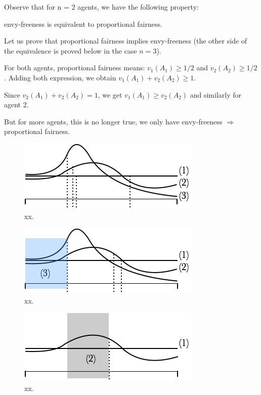 \bigskip

Observe that for n = 2 agents, we have the following property:

\begin{prop}
envy-freeness is equivalent to proportional fairness.
\end{prop}

Let us prove that proportional fairness implies envy-freeness (the other side of the equivalence is proved below in the case $n=3$).

For both agents, proportional fairness means: $v_1(A_1) \geq 1/2$ and $v_2(A_2) \geq 1/2$.
Adding both expression, we obtain $v_1(A_1)+v_2(A_2) \geq 1$.

Since $v_2(A_1) + v_2(A_2) = 1$, we get 
$v_1(A_1) \geq v_2(A_2)$ and similarly for agent 2. 
\bigskip

But for more agents, this is no longer true, we only have envy-freeness $\Rightarrow$ proportional fairness.
\begin{figure}[htb]
\begin{center}
        \includegraphics[scale=0.6]{FiguresMaths/CakeEnvyFree1}
        \caption{xx.}
        \label{Fig:cakeEnvyFree1}
\end{center}
\end{figure}
\begin{figure}[htb]
\begin{center}
        \includegraphics[scale=0.6]{FiguresMaths/CakeEnvyFree2}
        \caption{xx.}
        \label{Fig:cakeEnvyFree2}
\end{center}
\end{figure}
\begin{figure}[htb]
\begin{center}
        \includegraphics[scale=0.6]{FiguresMaths/CakeEnvyFree3}
        \caption{xx.}
        \label{Fig:cakeEnvyFree3}
\end{center}
\end{figure}

